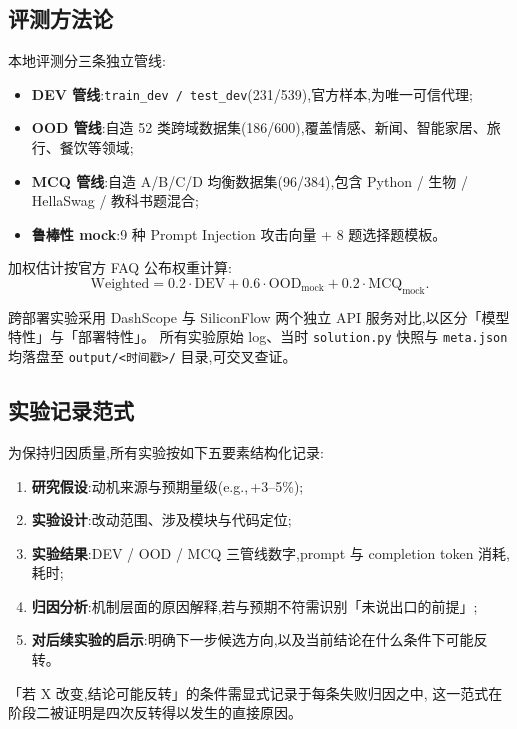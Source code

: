 \documentclass[11pt,a4paper]{ctexart}
\begin{document}
\subsection{评测方法论}

本地评测分三条独立管线:

\begin{itemize}[leftmargin=2em,itemsep=0.1em]
\item \textbf{DEV 管线}:\texttt{train\_dev / test\_dev}(231/539),官方样本,为唯一可信代理;
\item \textbf{OOD 管线}:自造 52 类跨域数据集(186/600),覆盖情感、新闻、智能家居、旅行、餐饮等领域;
\item \textbf{MCQ 管线}:自造 A/B/C/D 均衡数据集(96/384),包含 Python / 生物 / HellaSwag / 教科书题混合;
\item \textbf{鲁棒性 mock}:9 种 Prompt Injection 攻击向量 + 8 题选择题模板。
\end{itemize}

\noindent 加权估计按官方 FAQ 公布权重计算:
\[
\mathrm{Weighted} = 0.2 \cdot \mathrm{DEV} + 0.6 \cdot \mathrm{OOD}_\text{mock} + 0.2 \cdot \mathrm{MCQ}_\text{mock}.
\]

\noindent 跨部署实验采用 DashScope 与 SiliconFlow 两个独立 API 服务对比,以区分「模型特性」与「部署特性」。
所有实验原始 log、当时 \texttt{solution.py} 快照与 \texttt{meta.json} 均落盘至 \texttt{output/<时间戳>/} 目录,可交叉查证。

\subsection{实验记录范式}

为保持归因质量,所有实验按如下五要素结构化记录:

\begin{enumerate}[leftmargin=2em,itemsep=0.1em]
\item \textbf{研究假设}:动机来源与预期量级(e.g.,\,+3--5\%);
\item \textbf{实验设计}:改动范围、涉及模块与代码定位;
\item \textbf{实验结果}:DEV / OOD / MCQ 三管线数字,prompt 与 completion token 消耗,耗时;
\item \textbf{归因分析}:机制层面的原因解释,若与预期不符需识别「未说出口的前提」;
\item \textbf{对后续实验的启示}:明确下一步候选方向,以及当前结论在什么条件下可能反转。
\end{enumerate}

\noindent 「若 X 改变,结论可能反转」的条件需显式记录于每条失败归因之中,
这一范式在阶段二被证明是四次反转得以发生的直接原因。
\end{document}
